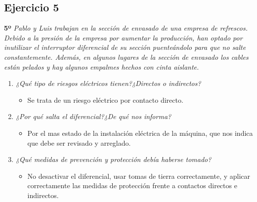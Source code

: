 \documentclass{article}
\begin{document}
        \subsection{Ejercicio 5}
        \textbf{5º} \textit{Pablo y Luis trabajan en la sección de envasado de una empresa de refrescos. Debido a la presión de la 
        empresa por aumentar la producción, han optado por inutilizar el interruptor diferencial de su sección puenteándolo para que 
        no salte constantemente. Además, en algunos lugares de la sección de envasado los cables están pelados y hay algunos empalmes 
        hechos con cinta aislante.}
        \begin{enumerate}[label=(\alph*)]
          \item \textit{¿Qué tipo de riesgos eléctricos tienen?¿Directos o indirectos?}
            \begin{itemize}
              \item Se trata de un riesgo eléctrico por contacto directo.
            \end{itemize}
          \item \textit{¿Por qué salta el diferencial?¿De qué nos informa?}
            \begin{itemize}
              \item Por el mas estado de la instalación eléctrica de la máquina, que nos indica que debe ser revisado y arreglado.
            \end{itemize}
          \item \textit{¿Qué medidas de prevención y protección debía haberse tomado?}
            \begin{itemize}
              \item No desactivar el diferencial, usar tomas de tierra correctamente, y aplicar correctamente las medidas de protección
               frente a contactos directos e indirectos.
            \end{itemize}
        \end{enumerate}
\end{document}

